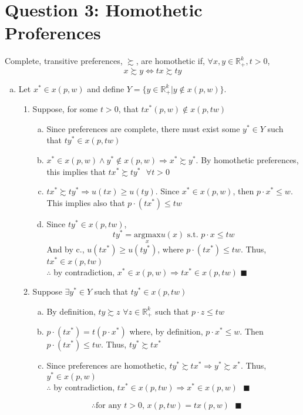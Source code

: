 \documentclass{article}
\newcommand{\R}{\mathbb{R}}
\begin{document}
\section*{Question 3: Homothetic Proferences}
Complete, transitive preferences, $\succsim$, are homothetic if, $\forall x,y\in\R_+^k,t>0$,
\[
	x\succsim y\iff tx\succsim ty
\]
\begin{enumerate}[(a)]
	\item Let $x^*\in x(p,w)$ and define $Y=\{y\in\R^k_+|y\notin x(p,w)\}$.
		\begin{enumerate}[1.]
			\item Suppose, for some $t>0$, that ${tx^*(p,w)\notin x(p,tw)}$
				\begin{enumerate}[a.]
					\item Since preferences are complete, there must exist some ${y^*\in Y}$ such that ${ty^*\in x(p,tw)}$
					\item ${x^*\in x(p,w)\land y^*\notin x(p,w)\Rightarrow x^*\succsim y^*}$. By homothetic preferences, this implies that ${tx^*\succsim ty^*\text{ }\forall t>0}$
					\item $tx^*\succsim ty^*\Rightarrow u(tx)\geq u(ty)$. Since $x^*\in x(p,w)$, then ${p\cdot x^*\leq w}$. This implies also that ${p\cdot (tx^*)\leq tw}$
					\item Since ${ty^*\in x(p,tw)}$, 
						\[
							ty^*=\underset{x}{\text{argmax}}u(x)\text{ s.t. }p\cdot x\leq tw
						\]
						And by c., $u(tx^*)\geq u(ty^*)$, where ${p\cdot (tx^*)\leq tw}$. Thus, $tx^*\in x(p,tw)$ 
						\smallskip \\
						$\therefore$ by contradiction, ${x^*\in x(p,w)\Rightarrow tx^*\in x(p,tw)}$ $\blacksquare$
				\end{enumerate}
			\item Suppose $\exists y^*\in Y$ such that $ty^*\in x(p,tw)$
				\begin{enumerate}[a.]
					\item By definition, $ty\succsim z$ $\forall z\in\R^k_+$ such that ${p\cdot z\leq tw}$
					\item $p\cdot(tx^*)=t(p\cdot x^*)$ where, by definition, $p\cdot x^*\leq w$. Then ${p\cdot(tx^*)\leq tw}$. Thus, ${ty^*\succsim tx^*}$
					\item Since preferences are homothetic, ${ty^*\succsim tx^*\Rightarrow y^*\succsim x^*}$. Thus, $y^*\in x(p,w)$ 
					\smallskip \\
					$\therefore$ by contradiction, ${tx^*\in x(p,tw)\Rightarrow x^*\in x(p,w)}\text{ }\blacksquare$
				\end{enumerate}
			\[
				\therefore\text{for any }t>0\text{, }x(p,tw)=tx(p,w)\text{ }\blacksquare
			\]
		\end{enumerate}
		
\end{enumerate}

\end{document}

